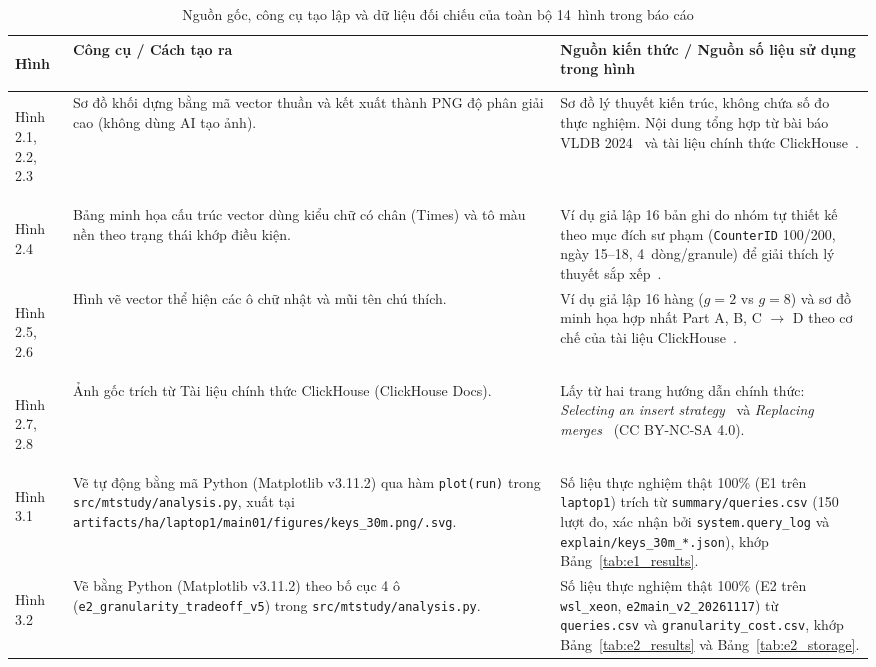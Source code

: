 \documentclass[13pt,a4paper]{report}
\begin{document}
\begin{table}[!htb]
\centering
\footnotesize
\renewcommand{\arraystretch}{1.15}
\caption{Nguồn gốc, công cụ tạo lập và dữ liệu đối chiếu của toàn bộ 14~hình trong báo cáo}
\label{tab:appendix_figures}
\begin{tabularx}{\textwidth}{>{\bfseries\raggedright\arraybackslash}p{2.25cm} >{\raggedright\arraybackslash}p{5.55cm} >{\raggedright\arraybackslash}X}
\toprule
\textbf{Hình} & \textbf{Công cụ / Cách tạo ra} & \textbf{Nguồn kiến thức / Nguồn số liệu sử dụng trong hình} \\
\midrule
Hình 2.1, 2.2, 2.3 & Sơ đồ khối dựng bằng mã vector thuần và kết xuất thành PNG độ phân giải cao (không dùng AI tạo ảnh). & Sơ đồ lý thuyết kiến trúc, không chứa số đo thực nghiệm. Nội dung tổng hợp từ bài báo VLDB 2024~\cite{A1} và tài liệu chính thức ClickHouse~\cite{S2, S3, S4}. \\
\addlinespace
Hình 2.4 & Bảng minh họa cấu trúc vector dùng kiểu chữ có chân (Times) và tô màu nền theo trạng thái khớp điều kiện. & Ví dụ giả lập 16 bản ghi do nhóm tự thiết kế theo mục đích sư phạm (\texttt{CounterID} 100/200, ngày 15--18, 4~dòng/granule) để giải thích lý thuyết sắp xếp~\cite{S2, S4}. \\
\addlinespace
Hình 2.5, 2.6 & Hình vẽ vector thể hiện các ô chữ nhật và mũi tên chú thích. & Ví dụ giả lập 16 hàng ($g = 2$ vs $g = 8$) và sơ đồ minh họa hợp nhất Part A, B, C $\rightarrow$ D theo cơ chế của tài liệu ClickHouse~\cite{S2, S3, S4, S5}. \\
\addlinespace
Hình 2.7, 2.8 & Ảnh gốc trích từ Tài liệu chính thức ClickHouse (ClickHouse Docs). & Lấy từ hai trang hướng dẫn chính thức: \textit{Selecting an insert strategy}~\cite{S9} và \textit{Replacing merges}~\cite{S5, V1} (CC BY-NC-SA 4.0). \\
\addlinespace
Hình 3.1 & Vẽ tự động bằng mã Python (Matplotlib v3.11.2) qua hàm \texttt{plot(run)} trong \texttt{src/\allowbreak{}mtstudy/\allowbreak{}analysis.py}, xuất tại \texttt{artifacts/\allowbreak{}ha/\allowbreak{}laptop1/\allowbreak{}main01/\allowbreak{}figures/\allowbreak{}keys\_\allowbreak{}30m.png/\allowbreak{}.svg}. & Số liệu thực nghiệm thật 100\% (E1 trên \texttt{laptop1}) trích từ \texttt{summary/\allowbreak{}queries.csv} (150 lượt đo, xác nhận bởi \texttt{system.\allowbreak{}query\_\allowbreak{}log} và \texttt{explain/\allowbreak{}keys\_\allowbreak{}30m\_\allowbreak{}*.json}), khớp Bảng~\ref{tab:e1_results}. \\
\addlinespace
Hình 3.2 & Vẽ bằng Python (Matplotlib v3.11.2) theo bố cục 4 ô (\texttt{e2\_\allowbreak{}granularity\_\allowbreak{}tradeoff\_\allowbreak{}v5}) trong \texttt{src/\allowbreak{}mtstudy/\allowbreak{}analysis.py}. & Số liệu thực nghiệm thật 100\% (E2 trên \texttt{wsl\_\allowbreak{}xeon}, \texttt{e2main\_\allowbreak{}v2\_\allowbreak{}20261117}) từ \texttt{queries.csv} và \texttt{granularity\_\allowbreak{}cost.csv}, khớp Bảng~\ref{tab:e2_results} và Bảng~\ref{tab:e2_storage}. \\

\end{tabularx}
\end{table}
\end{document}
